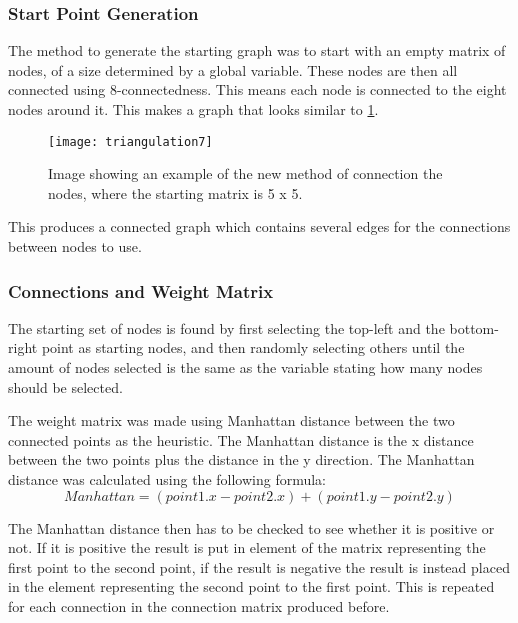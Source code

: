 \subsubsection{Start Point Generation}
	The method to generate the starting graph was to start with an empty matrix of nodes, of a size determined by a global variable. These nodes are then all connected using 8-connectedness. This means each node is connected to the eight nodes around it. This makes a graph that looks similar to \ref{fig:triangulation7}.

\begin{figure}[H]
	\texttt{[image: triangulation7]}
	\centering
	\caption{Image showing an example of the new method of connection the nodes, where the starting matrix is 5 x 5.}
	\label{fig:triangulation7}
\end{figure}

	This produces a connected graph which contains several edges for the connections between nodes to use.\\

\subsubsection{Connections and Weight Matrix}
	The starting set of nodes is found by first selecting the top-left and the bottom-right point as starting nodes, and then randomly selecting others until the amount of nodes selected is the same as the variable stating how many nodes should be selected.
	\newline
	\par
	The weight matrix was made using Manhattan distance between the two connected points as the heuristic. The Manhattan distance is the x distance between the two points plus the distance in the y direction. The Manhattan distance was calculated using the following formula:\\

	$$Manhattan = (point1.x - point2.x) + (point1.y - point2.y)$$
	
	The Manhattan distance then has to be checked to see whether it is positive or not. If it is positive the result is put in element of the matrix representing the first point to the second point, if the result is negative the result is instead placed in the element representing the second point to the first point. This is repeated for each connection in the connection matrix produced before.

